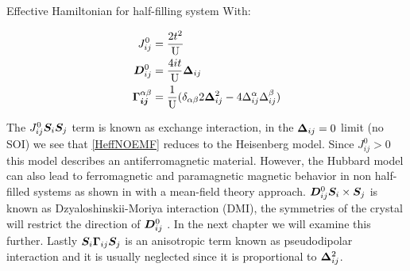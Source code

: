 \begin{section}{Effective Hamiltonian for half-filling system}
With:

\begin{align}
J_{ij}^0 &= \frac{2t^2}{\text{U}} \label{Jij0} \\
\boldsymbol{D}_{ij}^0 &= \frac{4it}{\text{U}}\boldsymbol{\Delta}_{ij} \label{Dij0} \\ 
\boldsymbol{\Gamma_{ij}}^{\alpha \beta} &= \frac{1}{\text{U}}(\delta_{\alpha \beta} 2\boldsymbol{\Delta}_{ij}^2 - 4\Delta_{ij}^\alpha\Delta_{ij}^\beta) \label{Gij0}
\end{align}

The $J_{ij}^0\boldsymbol{S}_i\boldsymbol{S}_j$ term is known as exchange interaction, in the $\boldsymbol{\Delta}_{ij} = 0$ limit (no SOI) we see that \ref{HeffNOEMF} reduces to the Heisenberg model. Since $J_{ij}^0 > 0$ this model describes an antiferromagnetic material. However, the Hubbard model can also lead to ferromagnetic and paramagnetic magnetic behavior in non half-filled systems as shown in \cite{Hirsch1985} with a mean-field theory approach. $\boldsymbol{D}_{ij}^0 \boldsymbol{S}_i \times \boldsymbol{S}_j$ is known as Dzyaloshinskii-Moriya
interaction (DMI), the symmetries of the crystal will restrict the direction of $\boldsymbol{D}_{ij}^0$ \cite{Moriya1960}. In the next chapter we will examine this further. Lastly $\boldsymbol{S}_i \boldsymbol{\Gamma}_{ij} \boldsymbol{S}_j$ is an anisotropic term known as pseudodipolar interaction \citep{Moriya1960} and it is usually neglected since it is proportional to $\boldsymbol{\Delta}_{ij}^2$.

\end{section}

